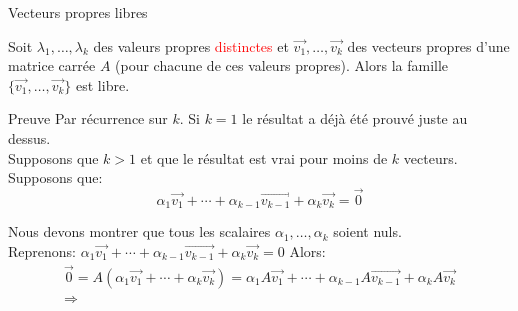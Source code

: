 \begin{parag}{Vecteurs propres libres}
    \begin{theoreme}
    Soit $\lambda_1, \dots, \lambda_k$ des valeurs propres \textcolor{red}{distinctes} et $\vec{v_1}, \dots, \vec{v_k}$ des vecteurs propres d'une matrice carrée $A$ (pour chacune de ces valeurs propres). Alors la famille $\{\vec{v_1}, \dots, \vec{v_k}\}$ est libre.
    \end{theoreme}
    \begin{subparag}{Preuve}
        Par récurrence sur $k$. Si $k = 1$ le résultat a déjà été prouvé juste au dessus.
        \\
        Supposons que $k > 1$ et que le résultat est vrai pour moins de $k$ vecteurs. Supposons que:
        \[\alpha_1\vec{v_1} + \cdots + \alpha_{k-1}\vec{v_{k-1}} + \alpha_k\vec{v_k} = \vec{0}\]

        Nous devons montrer que tous les scalaires $\alpha_1, \dots, \alpha_k$ soient nuls.\\
        Reprenons: $\alpha_1\vec{v_1} + \cdots + \alpha_{k-1}\vec{v_{k-1}} + \alpha_k\vec{v_k} = 0$ Alors:
        \begin{align*}
            \vec{0} = A(\alpha_1\vec{v_1} + \cdots + \alpha_k\vec{v_k}) = \alpha_1A\vec{v_1} + \cdots + \alpha_{k-1}A\vec{v_{k-1}} + \alpha_kA\vec{v_k}\\
            \Rightarrow 
        \end{align*}
    \end{subparag}
\end{parag}
